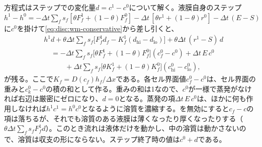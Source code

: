 方程式はステップでの変化量$d = c^{1} - c^{0}$について解く。液膜自身のステップ$h^{1} - h^{0} = -\Delta t \sum_f s_f[\theta F_f^{1} + (1-\theta)F_f^{0}]
- \Delta t\,[\theta r^{1} + (1-\theta)r^{0}] - \Delta t\,(E - S)$に$c^{0}$を掛けて\cref{eq:disc:wm-conservative}から差し引くと、
%
\begin{equation}\label{eq:disc:wm-change}
  \begin{aligned}
    &h^{1} d + \theta\Delta t \sum_f s_f\bigl[F_f^{1} d_f - K_f^{1}(d_{\mathrm{hi}} - d_{\mathrm{lo}})\bigr]
       + \theta\Delta t\,(r^{1} - S)\,d \\
    &\quad= -\Delta t \sum_f s_f \bigl[\theta F_f^{1} + (1-\theta)F_f^{0}\bigr](c^{0}_f - c^{0})
       + \Delta t\,E\,c^{0} \\
    &\qquad\quad{}+ \Delta t \sum_f s_f \bigl[\theta K_f^{1} + (1-\theta)K_f^{0}\bigr](c^{0}_{\mathrm{hi}} - c^{0}_{\mathrm{lo}}),
  \end{aligned}
\end{equation}
%
が残る。ここで$K_f = D(c_f)h_f/\Delta x$である。各セル界面値$c^{0}_f - c^{0}$は、セル界面の重みと$c^{0}_k - c^{0}$の積の和として作る。重みの和は1なので、$c^{0}$が一様で蒸発がなければ右辺は厳密にゼロになり、$d = 0$となる。蒸発の項$\Delta t\,E\,c^{0}$は、ほかに何も作用しなければ$h^{1}c^{1} = h^{0}c^{0}$となるように溶質を濃縮する。を無効にすると$c_f - c$の項は落ちるが、それでも溶質のある液膜は薄くなったり厚くなったりする（$\theta\Delta t \sum_f s_f
F_f^{1} d$）。このとき流れは液体だけを動かし、中の溶質は動かさないので、溶質は収支の形にならない。ステップ終了時の値は$c^{0} + d$である。

